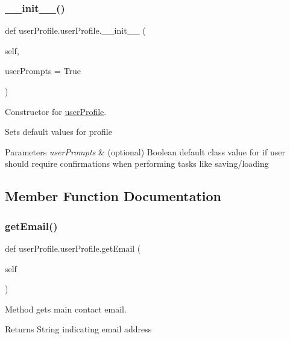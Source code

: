 \subsubsection{\texorpdfstring{\+\_\+\+\_\+init\+\_\+\+\_\+()}{\_\_init\_\_()}}
{\footnotesize\ttfamily def user\+Profile.\+user\+Profile.\+\_\+\+\_\+init\+\_\+\+\_\+ (\begin{DoxyParamCaption}\item[{}]{self,  }\item[{}]{user\+Prompts = {\ttfamily True} }\end{DoxyParamCaption})}



Constructor for \hyperlink{classuserProfile_1_1userProfile}{user\+Profile}. 

Sets default values for profile 
\begin{DoxyParams}{Parameters}
{\em user\+Prompts} & (optional) Boolean default class value for if user should require confirmations when performing tasks like saving/loading \\
\hline
\end{DoxyParams}


\subsection{Member Function Documentation}
\mbox{\label{classuserProfile_1_1userProfile_a31aed4505464a0f546e0bb33306a355d}} 
\subsubsection{\texorpdfstring{get\+Email()}{getEmail()}}
{\footnotesize\ttfamily def user\+Profile.\+user\+Profile.\+get\+Email (\begin{DoxyParamCaption}\item[{}]{self }\end{DoxyParamCaption})}



Method gets main contact email. 

\begin{DoxyReturn}{Returns}
String indicating email address 
\end{DoxyReturn}
\mbox{\label{classuserProfile_1_1userProfile_a3b66b43cf824415acf3c18dfb71ae226}} 
